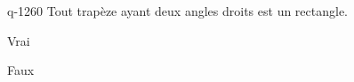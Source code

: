 \begin{truefalse}{q-1260}
Tout trapèze ayant deux angles droits est un rectangle.
\item Vrai
\item* Faux
\end{truefalse}

